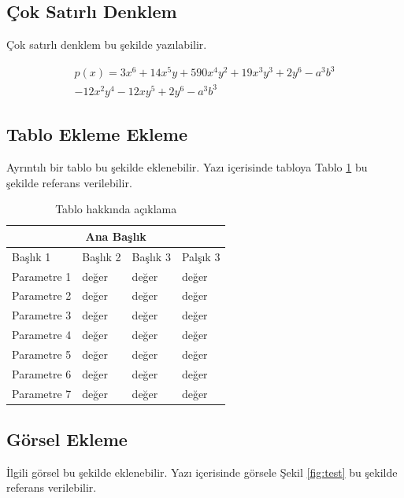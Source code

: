 \documentclass[12pt, a4paper]{article}
\begin{document}
\subsection{Çok Satırlı Denklem}

\hspace{1cm} Çok satırlı denklem bu şekilde yazılabilir.

\begin{multline*}
p(x) = 3x^6 + 14x^5y + 590x^4y^2 + 19x^3y^3 +  2y^6 - a^3b^3\\ 
- 12x^2y^4 - 12xy^5 + 2y^6 - a^3b^3
\end{multline*}



\subsection{Tablo Ekleme Ekleme}
\hspace{1cm} Ayrıntılı bir tablo bu şekilde eklenebilir. Yazı içerisinde tabloya Tablo \ref{table:1} bu şekilde referans verilebilir.

\begin{table}[h!]
\centering
\begin{tabular}{ |p{3cm}||p{3cm}|p{3cm}|p{3cm}|  }
\hline
\multicolumn{4}{|c|}{Ana Başlık} \\
\hline
Başlık 1& Başlık 2 &Başlık 3&Palşık 3\\
\hline
Parametre 1  	& değer 	&değer	&değer\\
Parametre 2	& değer  	&değer	&değer\\
Parametre 3	& değer 	&değer	&değer\\
Parametre 4	& değer 	&değer	&değer\\
Parametre 5	& değer 	&değer	&değer\\
Parametre 6	& değer  	&değer	&değer\\
Parametre 7	& değer 	&değer	&değer\\
\hline
\end{tabular}
\caption{Tablo hakkında açıklama}
\label{table:1}
\end{table}

\subsection{Görsel Ekleme}
\hspace{1cm} İlgili görsel bu şekilde eklenebilir. Yazı içerisinde görsele Şekil \ref{fig:test} bu şekilde referans verilebilir. 
\end{document}
